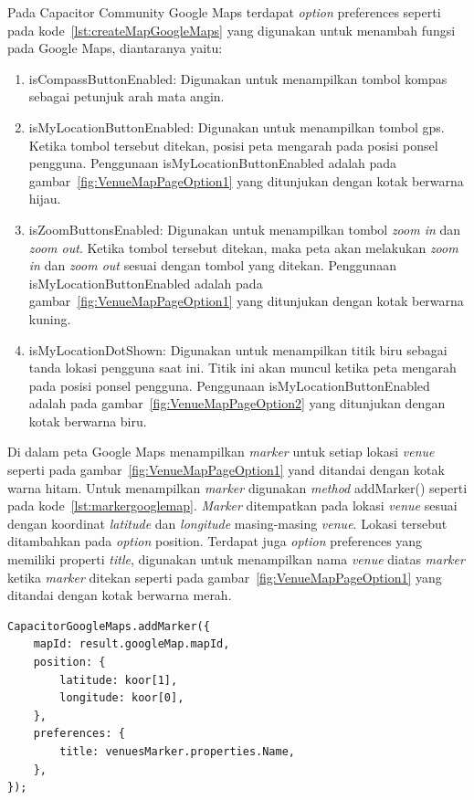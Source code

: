 \begin{itemize}
	Pada Capacitor Community Google Maps terdapat \textit{option} preferences seperti pada kode~\ref{lst:createMapGoogleMaps} yang digunakan untuk menambah fungsi pada Google Maps, diantaranya yaitu:
	
	\begin{enumerate}
		\item isCompassButtonEnabled: Digunakan untuk menampilkan tombol kompas sebagai petunjuk arah mata angin.
		\item isMyLocationButtonEnabled: Digunakan untuk menampilkan tombol gps. Ketika tombol tersebut ditekan, posisi peta mengarah pada posisi ponsel pengguna. Penggunaan isMyLocationButtonEnabled adalah pada gambar~\ref{fig:VenueMapPageOption1} yang ditunjukan dengan kotak berwarna hijau.
		\item isZoomButtonsEnabled: Digunakan untuk menampilkan tombol \textit{zoom in} dan \textit{zoom out}. Ketika tombol tersebut ditekan, maka peta akan melakukan \textit{zoom in} dan \textit{zoom out} sesuai dengan tombol yang ditekan. Penggunaan isMyLocationButtonEnabled adalah pada gambar~\ref{fig:VenueMapPageOption1} yang ditunjukan dengan kotak berwarna kuning.
		\item isMyLocationDotShown: Digunakan untuk menampilkan titik biru sebagai tanda lokasi pengguna saat ini. Titik ini akan muncul ketika peta mengarah pada posisi ponsel pengguna. Penggunaan isMyLocationButtonEnabled adalah pada gambar~\ref{fig:VenueMapPageOption2} yang ditunjukan dengan kotak berwarna biru.
	\end{enumerate}
	
	Di dalam peta Google Maps menampilkan \textit{marker} untuk setiap lokasi \textit{venue} seperti pada gambar~\ref{fig:VenueMapPageOption1} yand ditandai dengan kotak warna hitam. Untuk menampilkan \textit{marker} digunakan \textit{method} addMarker() seperti pada kode~\ref{lst:markergooglemap}. \textit{Marker} ditempatkan pada lokasi \textit{venue} sesuai dengan koordinat \textit{latitude} dan \textit{longitude} masing-masing \textit{venue}. Lokasi tersebut ditambahkan pada \textit{option} position. Terdapat juga \textit{option} preferences yang memiliki properti \textit{title}, digunakan untuk menampilkan nama \textit{venue} diatas \textit{marker} ketika \textit{marker} ditekan seperti pada gambar~\ref{fig:VenueMapPageOption1} yang ditandai dengan kotak berwarna merah.
\newpage
\begin{lstlisting}[label={lst:markergooglemap}, caption=\textit{Method} addMarker() Pada Capacitor Community Google Maps]
CapacitorGoogleMaps.addMarker({
	mapId: result.googleMap.mapId,
    position: {
    	latitude: koor[1],
        longitude: koor[0],
    },
    preferences: {
        title: venuesMarker.properties.Name,
    },
});
\end{lstlisting}


\end{itemize}
